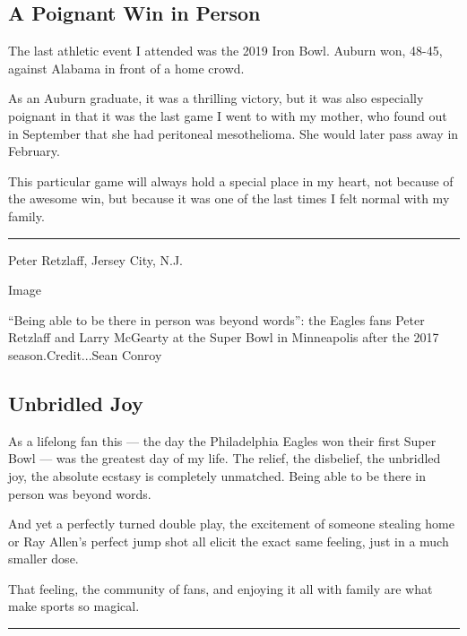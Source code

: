 \hypertarget{a-poignant-win-in-person}{%
\subsection{A Poignant Win in Person}\label{a-poignant-win-in-person}}

The last athletic event I attended was the 2019 Iron Bowl. Auburn won,
48-45, against Alabama in front of a home crowd.

As an Auburn graduate, it was a thrilling victory, but it was also
especially poignant in that it was the last game I went to with my
mother, who found out in September that she had peritoneal mesothelioma.
She would later pass away in February.

This particular game will always hold a special place in my heart, not
because of the awesome win, but because it was one of the last times I
felt normal with my family.

\begin{center}\rule{0.5\linewidth}{\linethickness}\end{center}

Peter Retzlaff, Jersey City, N.J.

Image

``Being able to be there in person was beyond words'': the Eagles fans
Peter Retzlaff and Larry McGearty at the Super Bowl in Minneapolis after
the 2017 season.Credit...Sean Conroy

\hypertarget{unbridled-joy}{%
\subsection{Unbridled Joy}\label{unbridled-joy}}

As a lifelong fan this --- the day the Philadelphia Eagles won their
first Super Bowl --- was the greatest day of my life. The relief, the
disbelief, the unbridled joy, the absolute ecstasy is completely
unmatched. Being able to be there in person was beyond words.

And yet a perfectly turned double play, the excitement of someone
stealing home or Ray Allen's perfect jump shot all elicit the exact same
feeling, just in a much smaller dose.

That feeling, the community of fans, and enjoying it all with family are
what make sports so magical.

\begin{center}\rule{0.5\linewidth}{\linethickness}\end{center}

